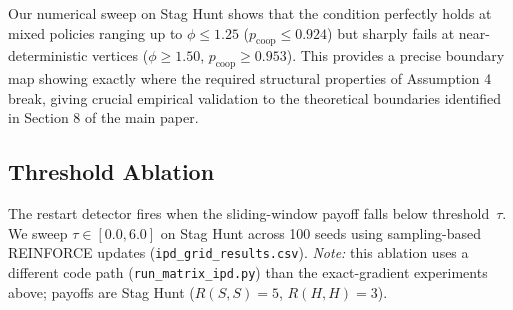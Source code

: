 \documentclass[11pt,a4paper]{article}
\newcommand{\repo}[1]{\texttt{\small #1}}
\theoremstyle{remark}
\begin{document}
Our numerical sweep on Stag Hunt shows that the condition perfectly holds at mixed policies ranging up to $\phi \le 1.25$ ($p_{\mathrm{coop}} \le 0.924$) but sharply fails at near-deterministic vertices ($\phi \ge 1.50$, $p_{\mathrm{coop}} \ge 0.953$). This provides a precise boundary map showing exactly where the required structural properties of Assumption 4 break, giving crucial empirical validation to the theoretical boundaries identified in Section 8 of the main paper.

\subsection{Threshold Ablation}
\label{sec:threshold_ablation}

The restart detector fires when the sliding-window payoff falls below
threshold~$\tau$.
We sweep $\tau \in [0.0, 6.0]$ on Stag Hunt across 100 seeds
using sampling-based REINFORCE updates (\repo{ipd\_grid\_results.csv}).
\emph{Note:} this ablation uses a different code path
(\repo{run\_matrix\_ipd.py}) than the exact-gradient experiments above;
payoffs are Stag Hunt ($R(S,S)=5$, $R(H,H)=3$).
\end{document}
